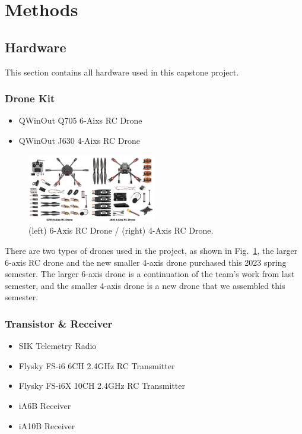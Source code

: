 \section{Methods}

\subsection{Hardware}\label{subsection:A}
This section contains all hardware used in this capstone project.
    \subsubsection{Drone Kit}\label{subsection:A1}
    \begin{itemize}
        \item QWinOut Q705 6-Aixs RC Drone
        \item QWinOut J630 4-Aixs RC Drone
    \end{itemize}

    \begin{figure}[H]
        \centerline{\includegraphics[width=0.5\textwidth]{Figures/Methods/Drone_Kits.png}}
        \caption{(left) 6-Axis RC Drone / (right) 4-Axis RC Drone.}
        \label{fig1}
    \end{figure}
    
    There are two types of drones used in the project, as shown in Fig.~\ref{fig1}, the larger 6-axis RC drone and the new smaller 4-axis drone purchased this 2023 spring semester. The larger 6-axis drone is a continuation of the team's work from last semester, and the smaller 4-axis drone is a new drone that we assembled this semester.
    
    \subsubsection{Transistor \& Receiver}\label{subsection:A2}
    \begin{itemize}
        \item SIK Telemetry Radio
        \item Flysky FS-i6   6CH 2.4GHz RC Transmitter
        \item Flysky FS-i6X 10CH 2.4GHz RC Transmitter
        \item iA6B Receiver
        \item iA10B Receiver
    \end{itemize}

